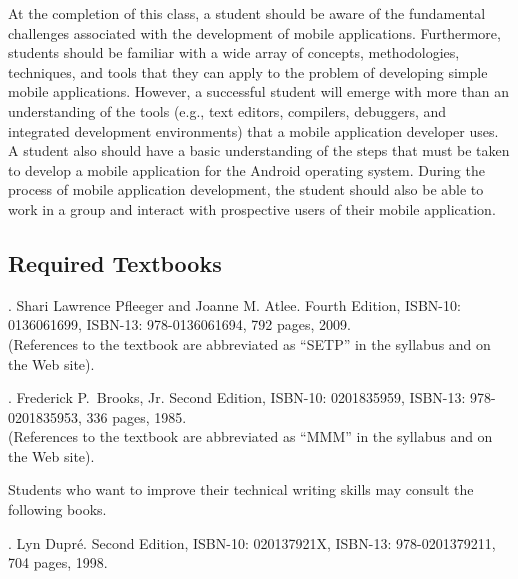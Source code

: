 At the completion of this class, a student should be aware of the fundamental challenges associated with the development 
of mobile applications.  Furthermore, students should be familiar with a wide array of concepts, methodologies, techniques, and
tools that they can apply to the problem of developing simple mobile applications.  However, a successful student will
emerge with more than an understanding of the tools (e.g., text editors, compilers, debuggers, and integrated development
environments) that a mobile application developer uses.  A student also should have a basic understanding of the steps
that must be taken to develop a mobile application for the Android operating system.  During the process of mobile
application development, the student should also be able to work in a group and interact with prospective users of their
mobile application.

\subsection*{Required Textbooks}


. Shari Lawrence Pfleeger and Joanne M. Atlee.
Fourth Edition, ISBN-10: 0136061699, ISBN-13: 978-0136061694, 792 pages, 2009. \\
(References to the textbook are abbreviated as ``SETP'' in the syllabus and on the Web site).


. Frederick P.\ Brooks, Jr.
Second Edition, ISBN-10: 0201835959, ISBN-13: 978-0201835953, 336 pages, 1985. \\
(References to the textbook are abbreviated as ``MMM'' in the syllabus and on the Web site).

\noindent
Students who want to improve their technical writing skills may consult the following books.

. Lyn Dupr\'e. Second Edition,  ISBN-10: 020137921X,
ISBN-13: 978-0201379211, 704 pages, 1998.


